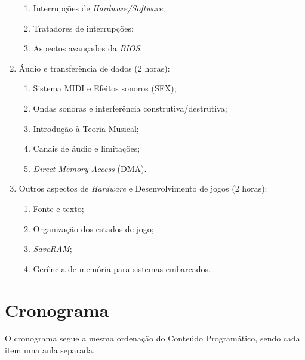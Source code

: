\documentclass{article}
\begin{document}
\begin{enumerate}
\begin{samepage}
        \begin{enumerate}
                \item Interrupções de \textit{Hardware/Software};
                \item Tratadores de interrupções;
                \item Aspectos avançados da \textit{BIOS}.
        \end{enumerate}
        \end{samepage}
    \item Áudio e transferência de dados (2 horas):
        \begin{samepage}
        \begin{enumerate}
                \item Sistema MIDI e Efeitos sonoros (SFX);
                \item Ondas sonoras e interferência construtiva/destrutiva;
                \item Introdução à Teoria Musical;
                \item Canais de áudio e limitações;
                \item \textit{Direct Memory Access} (DMA).
        \end{enumerate}
        \end{samepage}
    \item Outros aspectos de \textit{Hardware} e Desenvolvimento de jogos (2 horas):
        \begin{samepage}
        \begin{enumerate}
                \item Fonte e texto;
                \item Organização dos estados de jogo;
                \item \textit{SaveRAM};
                \item Gerência de memória para sistemas embarcados.
        \end{enumerate}
        \end{samepage}
\end{enumerate}

\section{Cronograma}

O cronograma segue a mesma ordenação do Conteúdo Programático, sendo cada item
uma aula separada.

\nocite{*}


\end{document}
